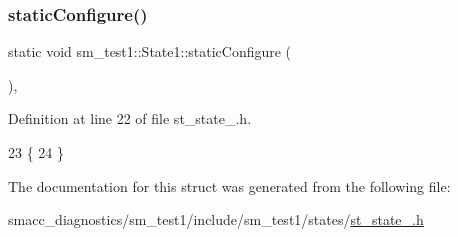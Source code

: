 \subsubsection{\texorpdfstring{static\+Configure()}{staticConfigure()}}
{\footnotesize\ttfamily static void sm\+\_\+test1\+::\+State1\+::static\+Configure (\begin{DoxyParamCaption}{ }\end{DoxyParamCaption})\hspace{0.3cm}{\ttfamily [inline]}, {\ttfamily [static]}}



Definition at line 22 of file st\+\_\+state\+\_.\+h.


\begin{DoxyCode}
23     \{
24     \}
\end{DoxyCode}


The documentation for this struct was generated from the following file\+:\begin{DoxyCompactItemize}
\item 
smacc\+\_\+diagnostics/sm\+\_\+test1/include/sm\+\_\+test1/states/\hyperlink{smacc__diagnostics_2sm__test1_2include_2sm__test1_2states_2st__state__1_8h}{st\+\_\+state\+\_.\+h}\end{DoxyCompactItemize}
